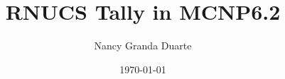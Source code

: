 \documentclass[12pt, letterpaper]{article}
\title{RNUCS Tally in MCNP6.2}
\author{Nancy Granda Duarte}
\date{\today}
\begin{document}
\maketitle






{}
\end{document}
